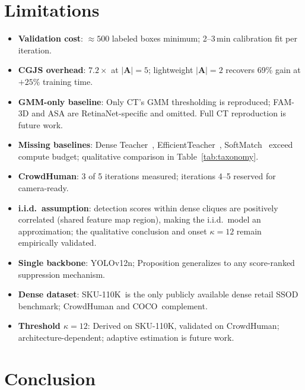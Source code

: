 \documentclass[10pt,twocolumn,letterpaper]{article}
\newcommand{\coco}{\textsc{COCO}\xspace}
\newcommand{\sku}{\textsc{SKU-110K}\xspace}
\begin{document}
\section{Limitations}
\label{sec:limitations}

\begin{itemize}[noitemsep,topsep=1pt,leftmargin=*]
  \item \textbf{Validation cost}: ${\approx}500$ labeled boxes minimum; 2--3\,min
    calibration fit per iteration.
  \item \textbf{CGJS overhead}: $7.2{\times}$ at $|\mathbf{A}|{=}5$;
    lightweight $|\mathbf{A}|{=}2$ recovers 69\% gain at $+25\%$ training time.
  \item \textbf{GMM-only baseline}: Only CT's GMM thresholding is reproduced;
    FAM-3D and ASA are RetinaNet-specific and omitted. Full CT reproduction is
    future work.
  \item \textbf{Missing baselines}: Dense Teacher~\cite{denseteacher2022},
    EfficientTeacher~\cite{efficientteacher2023}, SoftMatch~\cite{softmatch2023}
    exceed compute budget; qualitative comparison in Table~\ref{tab:taxonomy}.
  \item \textbf{CrowdHuman}: 3 of 5 iterations measured; iterations 4--5
    reserved for camera-ready.
  \item \textbf{i.i.d.\ assumption}: detection scores within dense cliques are positively correlated (shared feature map region), making the i.i.d.\ model an approximation; the qualitative conclusion and onset $\kappa{=}12$ remain empirically validated.
  \item \textbf{Single backbone}: YOLOv12n; Proposition generalizes to any
    score-ranked suppression mechanism.
  \item \textbf{Dense dataset}: \sku\ is the only publicly available dense
    retail SSOD benchmark; CrowdHuman and \coco\ complement.
  \item \textbf{Threshold $\kappa{=}12$}: Derived on \sku, validated on
    CrowdHuman; architecture-dependent; adaptive estimation is future work.
\end{itemize}

\section{Conclusion}
\label{sec:conclusion}
\end{document}

